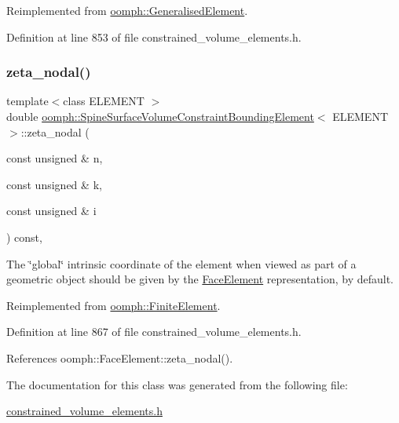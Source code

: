 Reimplemented from \hyperlink{classoomph_1_1GeneralisedElement_a6ae09fc0d68e4309ac1b03583d252845}{oomph\+::\+Generalised\+Element}.



Definition at line 853 of file constrained\+\_\+volume\+\_\+elements.\+h.

\mbox{\label{classoomph_1_1SpineSurfaceVolumeConstraintBoundingElement_aa252629ad8c455a83b5f2e9643a36e94}} 
\subsubsection{\texorpdfstring{zeta\+\_\+nodal()}{zeta\_nodal()}}
{\footnotesize\ttfamily template$<$class E\+L\+E\+M\+E\+NT $>$ \\
double \hyperlink{classoomph_1_1SpineSurfaceVolumeConstraintBoundingElement}{oomph\+::\+Spine\+Surface\+Volume\+Constraint\+Bounding\+Element}$<$ E\+L\+E\+M\+E\+NT $>$\+::zeta\+\_\+nodal (\begin{DoxyParamCaption}\item[{const unsigned \&}]{n,  }\item[{const unsigned \&}]{k,  }\item[{const unsigned \&}]{i }\end{DoxyParamCaption}) const\hspace{0.3cm}{\ttfamily [inline]}, {\ttfamily [virtual]}}



The \char`\"{}global\char`\"{} intrinsic coordinate of the element when viewed as part of a geometric object should be given by the \hyperlink{classoomph_1_1FaceElement}{Face\+Element} representation, by default. 



Reimplemented from \hyperlink{classoomph_1_1FiniteElement_a849561c5fbcbc07dc49d2dc6cca68559}{oomph\+::\+Finite\+Element}.



Definition at line 867 of file constrained\+\_\+volume\+\_\+elements.\+h.



References oomph\+::\+Face\+Element\+::zeta\+\_\+nodal().



The documentation for this class was generated from the following file\+:\begin{DoxyCompactItemize}
\item 
\hyperlink{constrained__volume__elements_8h}{constrained\+\_\+volume\+\_\+elements.\+h}\end{DoxyCompactItemize}
